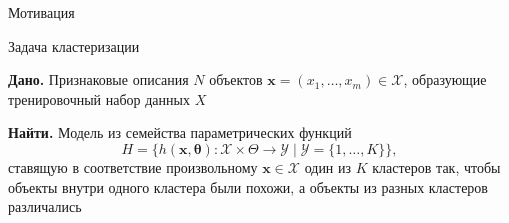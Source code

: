 \documentclass[aspectratio=169]{beamer}
\begin{document}
\begin{frame}{Мотивация}
\end{frame}

\begin{frame}{Задача кластеризации}

\vspace{1em}
{\bf Дано.} Признаковые описания $N$ объектов $\mathbf{x} = (x_1, \ldots, x_m) \in \mathcal{X}$, образующие тренировочный набор данных $X$

\vspace{1em}
{\bf Найти.} Модель из семейства параметрических функций 
\[
H = \{h(\mathbf{x, \mathbf{\theta}}): \mathcal{X} \times \Theta \rightarrow \mathcal{Y} \mid \mathcal{Y} = \{1, \ldots, K\}\},
\]
ставящую в соответствие произвольному $\mathbf{x} \in \mathcal{X}$ один из $K$ кластеров так, чтобы объекты внутри одного кластера были похожи, а объекты из разных кластеров различались

\end{frame}
\end{document}
